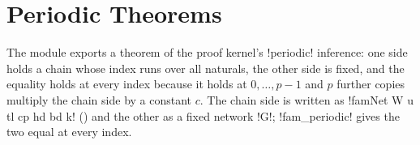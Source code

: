 {{{%
\section{Periodic Theorems}\label{sec:lean-export-periodic}

The module  exports a theorem of the proof
kernel's \lexcode!periodic! inference: one side holds a chain \bbox whose index runs over all
naturals, the other side is fixed, and the equality holds at every index because it holds at
$0, \ldots, p-1$ and $p$ further copies multiply the chain side by a constant $c$. The chain side
is written as \lexlean!famNet W u tl cp hd bd k! () and the other
as a fixed network \lexlean!G!; \lexlean!fam_periodic! gives the two equal at every index.

}}}
